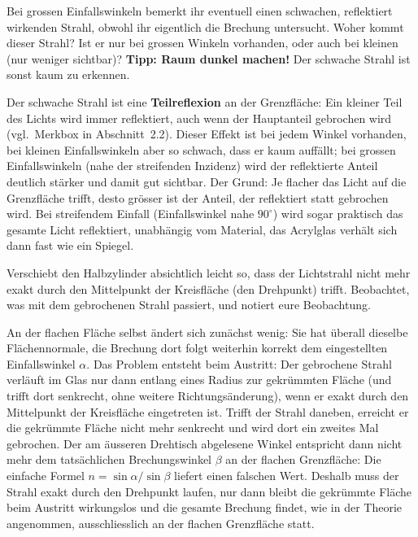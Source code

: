\documentclass[11pt,a4paper]{article}
\newcommand{\zeichenraum}[1][4.5cm]{%
  \par\vspace{4pt}\noindent
  \fbox{\begin{minipage}[t][#1][t]{\dimexpr\linewidth-2\fboxsep-2\fboxrule}\ \end{minipage}}
  \vspace{4pt}
}
\begin{document}
\begin{aufgabebox}
Bei grossen Einfallswinkeln bemerkt ihr eventuell einen schwachen, reflektiert wirkenden Strahl, obwohl ihr eigentlich die Brechung untersucht. Woher kommt dieser Strahl? Ist er nur bei grossen Winkeln vorhanden, oder auch bei kleinen (nur weniger sichtbar)? \textbf{Tipp: Raum dunkel machen!} Der schwache Strahl ist sonst kaum zu erkennen.
\end{aufgabebox}
\zeichenraum[4cm]
\begin{solution}
\begin{loesungbox}
Der schwache Strahl ist eine \textbf{Teilreflexion} an der Grenzfläche: Ein kleiner Teil des Lichts wird immer reflektiert, auch wenn der Hauptanteil gebrochen wird (vgl.\ Merkbox in Abschnitt~2.2). Dieser Effekt ist bei jedem Winkel vorhanden, bei kleinen Einfallswinkeln aber so schwach, dass er kaum auffällt; bei grossen Einfallswinkeln (nahe der streifenden Inzidenz) wird der reflektierte Anteil deutlich stärker und damit gut sichtbar. Der Grund: Je flacher das Licht auf die Grenzfläche trifft, desto grösser ist der Anteil, der reflektiert statt gebrochen wird. Bei streifendem Einfall (Einfallswinkel nahe $90^\circ$) wird sogar praktisch das gesamte Licht reflektiert, unabhängig vom Material, das Acrylglas verhält sich dann fast wie ein Spiegel.
\end{loesungbox}
\end{solution}

\begin{aufgabebox}
Verschiebt den Halbzylinder absichtlich leicht so, dass der Lichtstrahl nicht mehr exakt durch den Mittelpunkt der Kreisfläche (den Drehpunkt) trifft. Beobachtet, was mit dem gebrochenen Strahl passiert, und notiert eure Beobachtung.
\end{aufgabebox}
\zeichenraum[4cm]
\begin{solution}
\begin{loesungbox}
An der flachen Fläche selbst ändert sich zunächst wenig: Sie hat überall dieselbe Flächennormale, die Brechung dort folgt weiterhin korrekt dem eingestellten Einfallswinkel $\alpha$. Das Problem entsteht beim Austritt: Der gebrochene Strahl verläuft im Glas nur dann entlang eines Radius zur gekrümmten Fläche (und trifft dort senkrecht, ohne weitere Richtungsänderung), wenn er exakt durch den Mittelpunkt der Kreisfläche eingetreten ist. Trifft der Strahl daneben, erreicht er die gekrümmte Fläche nicht mehr senkrecht und wird dort ein zweites Mal gebrochen. Der am äusseren Drehtisch abgelesene Winkel entspricht dann nicht mehr dem tatsächlichen Brechungswinkel $\beta$ an der flachen Grenzfläche: Die einfache Formel $n=\sin\alpha/\sin\beta$ liefert einen falschen Wert. Deshalb muss der Strahl exakt durch den Drehpunkt laufen, nur dann bleibt die gekrümmte Fläche beim Austritt wirkungslos und die gesamte Brechung findet, wie in der Theorie angenommen, ausschliesslich an der flachen Grenzfläche statt.
\end{loesungbox}
\end{solution}
\end{document}
